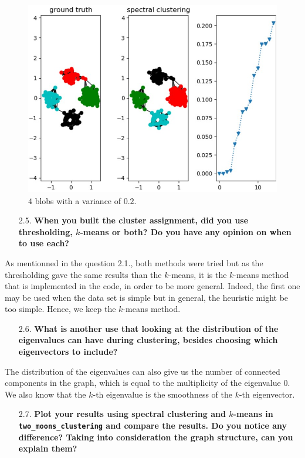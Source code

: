 \documentclass[a4paper, 11pt]{article}
\begin{document}
    \begin{figure}[!ht]
        \centering
        \includegraphics[width=.5\textwidth]{images/question_24_results.jpg}
        \caption{$4$ blobs with a variance of $0.2$.}
        \label{fig:question-24-results}
    \end{figure}

\begin{itemize}
    \item[2.5.] \textbf{When you built the cluster assignment, did you use thresholding, $k$-means or both? Do you have any opinion on when to use each?}
\end{itemize}

    As mentionned in the question 2.1., both methods were tried but as the thresholding gave the same results than the $k$-means, it is the $k$-means method that is implemented in the code, in order to be more general. Indeed, the first one may be used when the data set is simple but in general, the heuristic might be too simple. Hence, we keep the $k$-means method.

\begin{itemize}
    \item[2.6.] \textbf{What is another use that looking at the distribution of the eigenvalues can have during clustering, besides choosing which eigenvectors to include?}
\end{itemize}

    The distribution of the eigenvalues can also give us the number of connected components in the graph, which is equal to the multiplicity of the eigenvalue $0$. We also know that the $k$-th eigenvalue is the smoothness of the $k$-th eigenvector.

\begin{itemize}
    \item[2.7.] \textbf{Plot your results using spectral clustering and $k$-means in \texttt{two\_moons\_clustering} and compare the results. Do you notice any difference? Taking into consideration the graph structure, can you explain them?}
\end{itemize}
\end{document}
